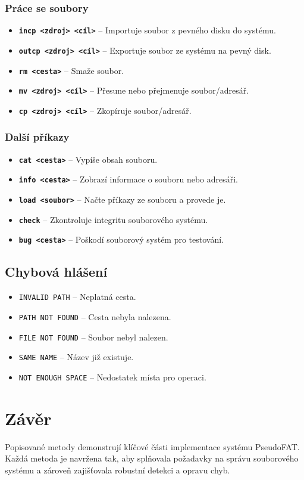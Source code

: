 \documentclass[12pt, a4paper]{article}
\begin{document}
\subsubsection{Práce se soubory}
\begin{itemize}
    \item \textbf{\texttt{incp <zdroj> <cíl>}} – Importuje soubor z pevného disku do systému.
    \item \textbf{\texttt{outcp <zdroj> <cíl>}} – Exportuje soubor ze systému na pevný disk.
    \item \textbf{\texttt{rm <cesta>}} – Smaže soubor.
    \item \textbf{\texttt{mv <zdroj> <cíl>}} – Přesune nebo přejmenuje soubor/adresář.
    \item \textbf{\texttt{cp <zdroj> <cíl>}} – Zkopíruje soubor/adresář.
\end{itemize}

\subsubsection{Další příkazy}
\begin{itemize}
    \item \textbf{\texttt{cat <cesta>}} – Vypíše obsah souboru.
    \item \textbf{\texttt{info <cesta>}} – Zobrazí informace o souboru nebo adresáři.
    \item \textbf{\texttt{load <soubor>}} – Načte příkazy ze souboru a provede je.
    \item \textbf{\texttt{check}} – Zkontroluje integritu souborového systému.
    \item \textbf{\texttt{bug <cesta>}} – Poškodí souborový systém pro testování.
\end{itemize}

\subsection{Chybová hlášení}
\begin{itemize}
    \item \texttt{INVALID PATH} – Neplatná cesta.
    \item \texttt{PATH NOT FOUND} – Cesta nebyla nalezena.
    \item \texttt{FILE NOT FOUND} – Soubor nebyl nalezen.
    \item \texttt{SAME NAME} – Název již existuje.
    \item \texttt{NOT ENOUGH SPACE} – Nedostatek místa pro operaci.
\end{itemize}


\section{Závěr}
Popisované metody demonstrují klíčové části implementace systému PseudoFAT. Každá metoda je navržena tak, aby splňovala požadavky na správu souborového systému a zároveň zajišťovala robustní detekci a opravu chyb.
\end{document}
